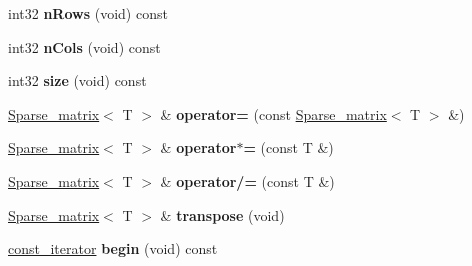 \begin{DoxyCompactItemize}
\item 
\hypertarget{structnih_1_1_sparse__matrix_aada1198281b4c7a21f86205f5eaf9f79}{
int32 {\bfseries n\-Rows} (void) const }
\label{structnih_1_1_sparse__matrix_aada1198281b4c7a21f86205f5eaf9f79}

\item 
\hypertarget{structnih_1_1_sparse__matrix_aef4bbd8932695a340724dfa7e9f86cdd}{
int32 {\bfseries n\-Cols} (void) const }
\label{structnih_1_1_sparse__matrix_aef4bbd8932695a340724dfa7e9f86cdd}

\item 
\hypertarget{structnih_1_1_sparse__matrix_a965454228a660b22a2f0e7cb414720d1}{
int32 {\bfseries size} (void) const }
\label{structnih_1_1_sparse__matrix_a965454228a660b22a2f0e7cb414720d1}

\item 
\hypertarget{structnih_1_1_sparse__matrix_a0dc79021beb26afa23c96777d3a0bb80}{
\hyperlink{structnih_1_1_sparse__matrix}{\-Sparse\-\_\-matrix}$<$ \-T $>$ \& {\bfseries operator=} (const \hyperlink{structnih_1_1_sparse__matrix}{\-Sparse\-\_\-matrix}$<$ \-T $>$ \&)}
\label{structnih_1_1_sparse__matrix_a0dc79021beb26afa23c96777d3a0bb80}

\item 
\hypertarget{structnih_1_1_sparse__matrix_a1f04b57c3076fef9ad03990fc45c66cd}{
\hyperlink{structnih_1_1_sparse__matrix}{\-Sparse\-\_\-matrix}$<$ \-T $>$ \& {\bfseries operator$\ast$=} (const \-T \&)}
\label{structnih_1_1_sparse__matrix_a1f04b57c3076fef9ad03990fc45c66cd}

\item 
\hypertarget{structnih_1_1_sparse__matrix_a7f8fc646cf57e4c421d6aac222f4ad88}{
\hyperlink{structnih_1_1_sparse__matrix}{\-Sparse\-\_\-matrix}$<$ \-T $>$ \& {\bfseries operator/=} (const \-T \&)}
\label{structnih_1_1_sparse__matrix_a7f8fc646cf57e4c421d6aac222f4ad88}

\item 
\hypertarget{structnih_1_1_sparse__matrix_abeced2fd2875d52b87d4e0dc470a7ed3}{
\hyperlink{structnih_1_1_sparse__matrix}{\-Sparse\-\_\-matrix}$<$ \-T $>$ \& {\bfseries transpose} (void)}
\label{structnih_1_1_sparse__matrix_abeced2fd2875d52b87d4e0dc470a7ed3}

\item 
\hypertarget{structnih_1_1_sparse__matrix_ab7b36701d30f2dbe29cd9c2a291b983a}{
\hyperlink{classnih_1_1_sparse__matrix_1_1const__iterator}{const\-\_\-iterator} {\bfseries begin} (void) const }
\label{structnih_1_1_sparse__matrix_ab7b36701d30f2dbe29cd9c2a291b983a}


\end{DoxyCompactItemize}
